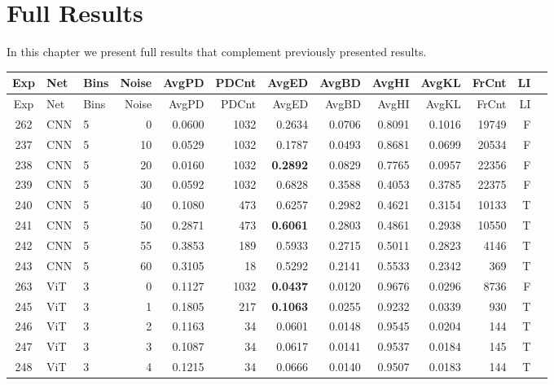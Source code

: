 
\chapter{Full Results}
\label{AppendixG-full-results} %

In this chapter we present full results that complement previously presented results.

\begin{longtable}{@{}cllrrrrrrrrrc@{}}
\toprule
Exp & Net & Bins & Noise & AvgPD & PDCnt & AvgED & AvgBD & AvgHI & AvgKL & FrCnt & LI \\
\midrule
\endfirsthead
\toprule
Exp & Net & Bins & Noise & AvgPD & PDCnt & AvgED & AvgBD & AvgHI & AvgKL & FrCnt & LI \\
\midrule
\endhead
262 & CNN & 5 & 0 & 0.0600 & 1032 & 0.2634 & 0.0706 & 0.8091 & 0.1016 & 19749 & F \\
237 & CNN & 5 & 10 & 0.0529 & 1032 & 0.1787 & 0.0493 & 0.8681 & 0.0699 & 20534 & F \\
238 & CNN & 5 & 20 & 0.0160 & 1032 & \textbf{0.2892} & 0.0829 & 0.7765 & 0.0957 & 22356 & F \\
239 & CNN & 5 & 30 & 0.0592 & 1032 & 0.6828 & 0.3588 & 0.4053 & 0.3785 & 22375 & F \\
240 & CNN & 5 & 40 & 0.1080 & 473 & 0.6257 & 0.2982 & 0.4621 & 0.3154 & 10133 & T \\
241 & CNN & 5 & 50 & 0.2871 & 473 & \textbf{0.6061} & 0.2803 & 0.4861 & 0.2938 & 10550 & T \\
242 & CNN & 5 & 55 & 0.3853 & 189 & 0.5933 & 0.2715 & 0.5011 & 0.2823 & 4146 & T \\
243 & CNN & 5 & 60 & 0.3105 & 18 & 0.5292 & 0.2141 & 0.5533 & 0.2342 & 369 & T \\
263 & ViT & 3 & 0 & 0.1127 & 1032 & \textbf{0.0437} & 0.0120 & 0.9676 & 0.0296 & 8736 & F \\
245 & ViT & 3 & 1 & 0.1805 & 217 & \textbf{0.1063} & 0.0255 & 0.9232 & 0.0339 & 930 & T \\
246 & ViT & 3 & 2 & 0.1163 & 34 & 0.0601 & 0.0148 & 0.9545 & 0.0204 & 144 & T \\
247 & ViT & 3 & 3 & 0.1087 & 34 & 0.0617 & 0.0141 & 0.9537 & 0.0184 & 145 & T \\
248 & ViT & 3 & 4 & 0.1215 & 34 & 0.0666 & 0.0140 & 0.9507 & 0.0183 & 144 & T \\

\end{longtable}
